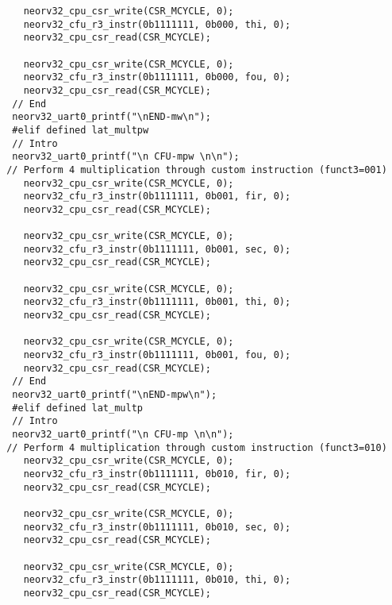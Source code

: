 \begin{code}
\begin{verbatim}
    neorv32_cpu_csr_write(CSR_MCYCLE, 0);
    neorv32_cfu_r3_instr(0b1111111, 0b000, thi, 0); 
    neorv32_cpu_csr_read(CSR_MCYCLE); 

    neorv32_cpu_csr_write(CSR_MCYCLE, 0);
    neorv32_cfu_r3_instr(0b1111111, 0b000, fou, 0); 
    neorv32_cpu_csr_read(CSR_MCYCLE); 
  // End
  neorv32_uart0_printf("\nEND-mw\n");
  #elif defined lat_multpw
  // Intro
  neorv32_uart0_printf("\n CFU-mpw \n\n");
 // Perform 4 multiplication through custom instruction (funct3=001)
    neorv32_cpu_csr_write(CSR_MCYCLE, 0);
    neorv32_cfu_r3_instr(0b1111111, 0b001, fir, 0); 
    neorv32_cpu_csr_read(CSR_MCYCLE); 

    neorv32_cpu_csr_write(CSR_MCYCLE, 0);
    neorv32_cfu_r3_instr(0b1111111, 0b001, sec, 0); 
    neorv32_cpu_csr_read(CSR_MCYCLE); 

    neorv32_cpu_csr_write(CSR_MCYCLE, 0);
    neorv32_cfu_r3_instr(0b1111111, 0b001, thi, 0); 
    neorv32_cpu_csr_read(CSR_MCYCLE); 

    neorv32_cpu_csr_write(CSR_MCYCLE, 0);
    neorv32_cfu_r3_instr(0b1111111, 0b001, fou, 0); 
    neorv32_cpu_csr_read(CSR_MCYCLE); 
  // End
  neorv32_uart0_printf("\nEND-mpw\n");
  #elif defined lat_multp
  // Intro
  neorv32_uart0_printf("\n CFU-mp \n\n");
 // Perform 4 multiplication through custom instruction (funct3=010)
    neorv32_cpu_csr_write(CSR_MCYCLE, 0);
    neorv32_cfu_r3_instr(0b1111111, 0b010, fir, 0); 
    neorv32_cpu_csr_read(CSR_MCYCLE); 

    neorv32_cpu_csr_write(CSR_MCYCLE, 0);
    neorv32_cfu_r3_instr(0b1111111, 0b010, sec, 0); 
    neorv32_cpu_csr_read(CSR_MCYCLE); 

    neorv32_cpu_csr_write(CSR_MCYCLE, 0);
    neorv32_cfu_r3_instr(0b1111111, 0b010, thi, 0); 
    neorv32_cpu_csr_read(CSR_MCYCLE); 


\end{verbatim}
\end{code}
